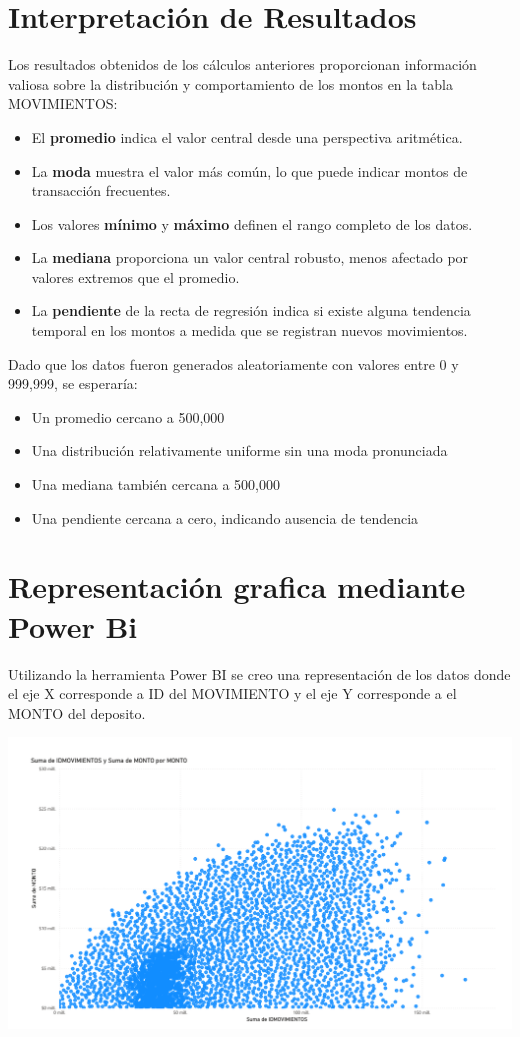 \section{Interpretación de Resultados}
Los resultados obtenidos de los cálculos anteriores proporcionan información valiosa sobre la distribución y comportamiento de los montos en la tabla MOVIMIENTOS:
\begin{itemize}
	\item El \textbf{promedio} indica el valor central desde una perspectiva aritmética.
	\item La \textbf{moda} muestra el valor más común, lo que puede indicar montos de transacción frecuentes.
	\item Los valores \textbf{mínimo} y \textbf{máximo} definen el rango completo de los datos.
	\item La \textbf{mediana} proporciona un valor central robusto, menos afectado por valores extremos que el promedio.
	\item La \textbf{pendiente} de la recta de regresión indica si existe alguna tendencia temporal en los montos a medida que se registran nuevos movimientos.
\end{itemize}
Dado que los datos fueron generados aleatoriamente con valores entre 0 y 999,999, se esperaría:
\begin{itemize}
	\item Un promedio cercano a 500,000
	\item Una distribución relativamente uniforme sin una moda pronunciada
	\item Una mediana también cercana a 500,000
	\item Una pendiente cercana a cero, indicando ausencia de tendencia
\end{itemize}

\section{Representación grafica mediante Power Bi}

Utilizando la herramienta Power BI se creo una representación de los datos donde el eje X corresponde a ID del MOVIMIENTO y el eje Y corresponde a el MONTO del deposito.

\includegraphics[width=\textwidth, keepaspectratio]{imagenes/powerbi}

